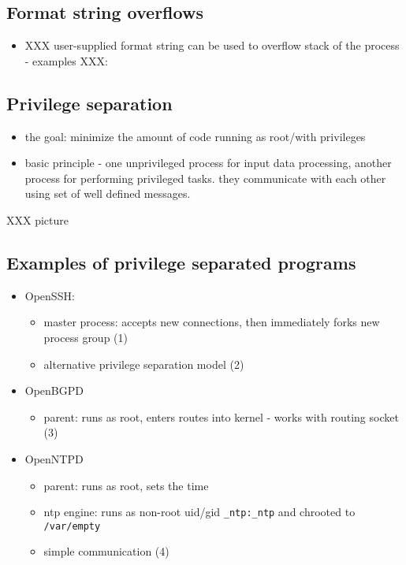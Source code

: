 
\subsection{Format string overflows}

\begin{itemize}
\item XXX user-supplied format string can be used to overflow stack of the
process
  - examples XXX:
\end{itemize}




\subsection{Privilege separation}

\begin{itemize}
  \item the goal: minimize the amount of code running as root/with privileges
  \item basic principle - one unprivileged process for input data processing,
		    another process for performing privileged tasks.
		    they communicate with each other using set of well
                    defined messages.
\end{itemize}


XXX picture



\subsection{Examples of privilege separated programs}

\begin{itemize}
\item OpenSSH:
  \begin{itemize}
  \item master process: accepts new connections, then immediately forks new
    process group (1)
  \item alternative privilege separation model (2)
  \end{itemize}
\item OpenBGPD
  \begin{itemize}
  \item parent: runs as root, enters routes into kernel
    - works with routing socket (3)
  \end{itemize}
\item OpenNTPD
  \begin{itemize}
  \item parent: runs as root, sets the time
  \item ntp engine: runs as non-root uid/gid \texttt{\_ntp:\_ntp} and
     chrooted to \texttt{/var/empty}
  \item simple communication (4)
  \end{itemize}
\end{itemize}


